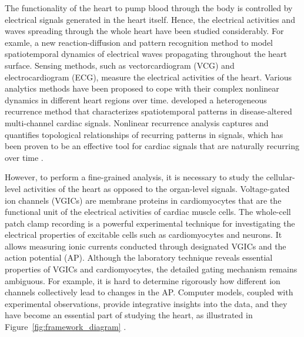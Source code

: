\documentclass[11pt]{article}
\begin{document}
The functionality of the heart to pump blood through the body is controlled by electrical signals generated in the heart itself. Hence, the electrical activities and waves spreading through the whole heart have been studied considerably. For examle, \citet{yang2016whole} a new reaction-diffusion and pattern recognition method to model spatiotemporal dynamics of electrical waves propagating throughout the heart surface. Sensing methods, such as vectorcardiogram (VCG) and electrocardiogram (ECG), measure the electrical activities of the heart. Various analytics methods have been proposed to cope with their complex nonlinear dynamics in different heart regions over time. \citet{chen2019heterogeneous} developed a heterogeneous recurrence method that characterizes spatiotemporal patterns in disease-altered multi-channel cardiac signals. Nonlinear recurrence analysis captures and quantifies topological relationships of recurring patterns in signals, which has been proven to be an effective tool for cardiac signals that are naturally recurring over time \citep{yang2010multiscale,meyers2020cross}. 

However, to perform a fine-grained analysis, it is necessary to study the cellular-level activities of the heart as opposed to the organ-level signals. Voltage-gated ion channels (VGICs) are membrane proteins in cardiomyocytes that are the functional unit of the electrical activities of cardiac muscle cells. The whole-cell patch clamp recording is a powerful experimental technique for investigating the electrical properties of excitable cells such as cardiomyocytes and neurons. It allows measuring ionic currents conducted through designated VGICs and the action potential (AP). Although the laboratory technique reveals essential properties of VGICs and cardiomyocytes, the detailed gating mechanism remains ambiguous. For example, it is hard to determine rigorously how different ion channels collectively lead to changes in the AP. Computer models, coupled with experimental observations, provide integrative insights into the data, and they have become an essential part of studying the heart, as illustrated in Figure~\ref{fig:framework_diagram} \citep{winslow2011integrative}. 
\end{document}
